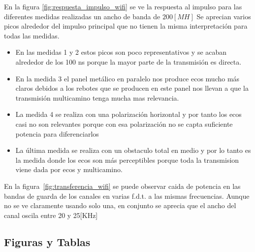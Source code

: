 \documentclass[10pt,conference,a4paper]{IEEEtran}
\begin{document}
En la figura \ref{fig:respuesta_impulso_wifi} se ve la respuesta al impulso para las diferentes medidas realizadas  un ancho de banda de $200[MH]$
Se aprecian varios picos alrededor del impulso principal que no tienen la misma interpretación para todas las medidas.
\begin{itemize}
    \item En las medidas 1 y 2 estos picos son poco representativos y se acaban alrededor de los 100 ns porque la mayor parte de la transmisión es directa.
    \item En la medida 3 el panel metálico en paralelo nos produce ecos mucho más claros debidos a los rebotes que se producen en este panel nos llevan a que la transmisión multicamino tenga mucha mas relevancia.
    \item La medida 4 se realiza con una polarización horizontal y por tanto los ecos casi no son relevantes porque con esa polarización no se capta suficiente potencia para diferenciarlos
    \item La última medida se realiza con un obstaculo total en medio y por lo tanto es la medida donde los ecos son más perceptibles porque toda la transmision viene dada por ecos y multicamino.
\end{itemize}

En la figura~\ref{fig:transferencia_wifi} se puede observar caida de potencia en las bandas de guarda de los canales en varias f.d.t. a las mismas frecuencias. Aunque no se ve claramente usando solo una, en conjunto se aprecia que el ancho del canal oscila entre 20 y 25[KHz]

\subsection{Figuras y Tablas}
\end{document}

